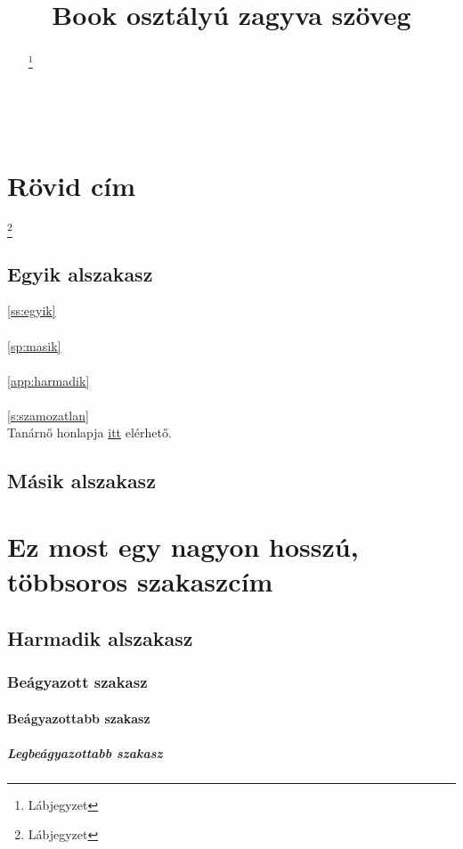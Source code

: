 \documentclass[twoside,12pt]{article}
\begin{document}
\title{Book osztályú zagyva szöveg}
\maketitle
\pagestyle{fancy}
\clearpage
\begin{abstract}
\hulipsum[1-2]
\footnote{Lábjegyzet}
\end{abstract}
\clearpage
{}
\tableofcontents
\clearpage
~
\clearpage
{}
\section[1. szakasz]{Rövid cím}
\footnote{Lábjegyzet}
\subsection{Egyik alszakasz}
\autoref{ss:egyik}\\
\\
\autoref{sp:masik}\\
\\
\autoref{app:harmadik}\\
\\
\ref{s:szamozatlan}\\
Tanárnő honlapja \href{https://web.uni-miskolc.hu/~viktoria.vadon/}{itt} elérhető.\\
\hulipsum[3-7]
\subsection{Másik alszakasz}
\hulipsum[8-10]
\label{ss:egyik}
\hulipsum[11]
\section[2. szakasz]{Ez most egy nagyon hosszú, többsoros szakaszcím}
\subsection{Harmadik alszakasz}
\hulipsum[12-14]
\subsubsection{Beágyazott szakasz}
\hulipsum[15-17]
\paragraph{Beágyazottabb szakasz}
\hulipsum[18-20]
\subparagraph{Legbeágyazottabb szakasz}
\label{sp:masik}
\hulipsum[21-23]
\end{document}
